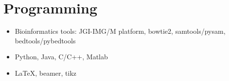 \documentclass[letterpaper,11pt]{article}
\newcommand{\resumeItem}[2]{
  \item\small{
    \textbf{#1}{ #2 \vspace{-2pt}}
  }
}
\newcommand{\resumeSubItem}[2]{\resumeItem{#1}{#2}\vspace{-4pt}}
\newcommand{\resumeSubHeadingListStart}{\begin{itemize}[leftmargin=*]}
\newcommand{\resumeSubHeadingListEnd}{\end{itemize}}
\begin{document}
\section{Programming}
 \resumeSubHeadingListStart
   \resumeSubItem{}{Bioinformatics tools: JGI-IMG/M platform, bowtie2,  samtools/pysam, bedtools/pybedtools}
   \resumeSubItem{}{Python, Java, C/C++, Matlab}
   \resumeSubItem{}{LaTeX, beamer, tikz}
 \resumeSubHeadingListEnd


\end{document}
